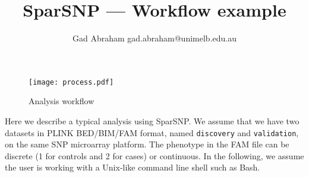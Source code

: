 \documentclass[a4paper,11pt]{article}
\title{SparSNP --- Workflow example}
\author{Gad Abraham gad.abraham@unimelb.edu.au}
\begin{document}
\maketitle

\begin{figure}[h]
\centering
\texttt{[image: process.pdf]}
\caption{Analysis workflow}
\label{fig:process}
\end{figure}


Here we describe a typical analysis using SparSNP.  We assume that we have
two datasets in PLINK BED/BIM/FAM format, named \texttt{discovery} and
\texttt{validation}, on the same SNP microarray platform. The phenotype in
the FAM file can be discrete (1 for controls and 2 for cases) or continuous.
In the following, we assume the user is working with a Unix-like command
line shell such as Bash.
\end{document}
